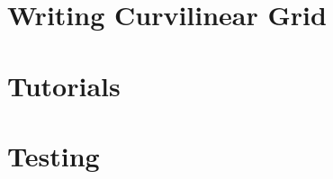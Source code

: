 \documentclass[a4paper,11pt]{article}
\begin{document}
\pagebreak
\section{Writing Curvilinear Grid}



%


\pagebreak
\section{Tutorials}









\pagebreak
\section{Testing}












\end{document}
